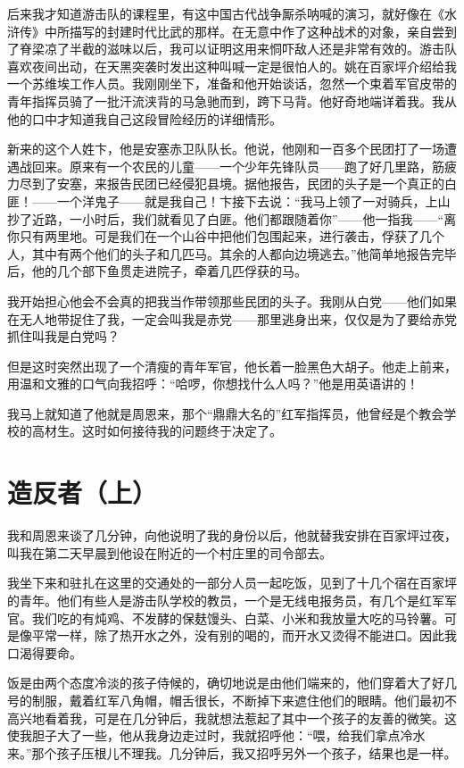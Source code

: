 \documentclass[10pt]{book}
\begin{document}
后来我才知道游击队的课程里，有这中国古代战争厮杀呐喊的演习，就好像在《水浒传》中所描写的封建时代比武的那样。在无意中作了这种战术的对象，亲自尝到了脊梁凉了半截的滋味以后，我可以证明这用来恫吓敌人还是非常有效的。游击队喜欢夜间出动，在天黑突袭时发出这种叫喊一定是很怕人的。姚在百家坪介绍给我一个苏维埃工作人员。我刚刚坐下，准备和他开始谈话，忽然一个束着军官皮带的青年指挥员骑了一批汗流浃背的马急驰而到，跨下马背。他好奇地端详着我。我从他的口中才知道我自己这段冒险经历的详细情形。

新来的这个人姓卞，他是安塞赤卫队队长。他说，他刚和一百多个民团打了一场遭遇战回来。原来有一个农民的儿童——一个少年先锋队员——跑了好几里路，筋疲力尽到了安塞，来报告民团已经侵犯县境。据他报告，民团的头子是一个真正的白匪！——一个洋鬼子——就是我自己！卞接下去说：“我马上领了一对骑兵，上山抄了近路，一小时后，我们就看见了白匪。他们都跟随着你”——他一指我——“离你只有两里地。可是我们在一个山谷中把他们包围起来，进行袭击，俘获了几个人，其中有两个他们的头子和几匹马。其余的人都向边境逃去。”他简单地报告完毕后，他的几个部下鱼贯走进院子，牵着几匹俘获的马。

我开始担心他会不会真的把我当作带领那些民团的头子。我刚从白党——他们如果在无人地带捉住了我，一定会叫我是赤党——那里逃身出来，仅仅是为了要给赤党抓住叫我是白党吗？

但是这时突然出现了一个清瘦的青年军官，他长着一脸黑色大胡子。他走上前来，用温和文雅的口气向我招呼：“哈啰，你想找什么人吗？”他是用英语讲的！

我马上就知道了他就是周恩来，那个“鼎鼎大名的”红军指挥员，他曾经是个教会学校的高材生。这时如何接待我的问题终于决定了。

\section{造反者（上）}

我和周恩来谈了几分钟，向他说明了我的身份以后，他就替我安排在百家坪过夜，叫我在第二天早晨到他设在附近的一个村庄里的司令部去。

我坐下来和驻扎在这里的交通处的一部分人员一起吃饭，见到了十几个宿在百家坪的青年。他们有些人是游击队学校的教员，一个是无线电报务员，有几个是红军军官。我们吃的有炖鸡、不发酵的保麸馒头、白菜、小米和我放量大吃的马铃薯。可是像平常一样，除了热开水之外，没有别的喝的，而开水又烫得不能进口。因此我口渴得要命。

饭是由两个态度冷淡的孩子侍候的，确切地说是由他们端来的，他们穿着大了好几号的制服，戴着红军八角帽，帽舌很长，不断掉下来遮住他们的眼睛。他们最初不高兴地看着我，可是在几分钟后，我就想法惹起了其中一个孩子的友善的微笑。这使我胆子大了一些，他从我身边走过时，我就招呼他：“喂，给我们拿点冷水来。”那个孩子压根儿不理我。几分钟后，我又招呼另外一个孩子，结果也是一样。
\end{document}
